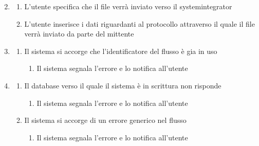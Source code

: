 \begin{enumerate}
\setcounter{enumi}{1}
 \item
     \begin{enumerate}
     \item L’utente specifica che il file verrà inviato verso il \gls{systemintegrator}
     \item L'utente inserisce i dati riguardanti al protocollo attraverso il quale il file verrà inviato da parte del mittente
    \end{enumerate}
 
 \item 
     \begin{enumerate}
     \item Il sistema si accorge che l'identificatore del flusso è gia in uso
        \begin{enumerate}
            \item Il sistema segnala l’errore e lo notifica all’utente
        \end{enumerate}
    \end{enumerate}
\setcounter{enumi}{4}    
 \item 
     \begin{enumerate}
     \item Il database verso il quale il sistema è in scrittura non risponde
        \begin{enumerate}
            \item Il sistema segnala l’errore e lo notifica all’utente
        \end{enumerate}
     \item Il sistema si accorge di un errore generico nel flusso
        \begin{enumerate}
            \item Il sistema segnala l’errore e lo notifica all’utente
        \end{enumerate}  
    \end{enumerate}
\end{enumerate}

\clearpage






